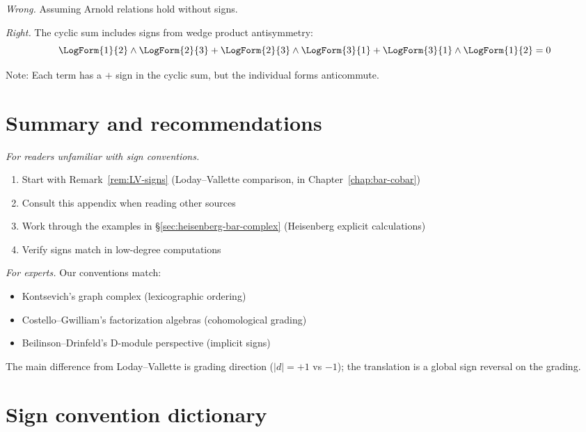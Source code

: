 \emph{Wrong.} Assuming Arnold relations hold without signs.

\emph{Right.} The cyclic sum includes signs from wedge product antisymmetry:
\[\LogForm{1}{2} \wedge \LogForm{2}{3} + \LogForm{2}{3} \wedge \LogForm{3}{1} + \LogForm{3}{1} \wedge \LogForm{1}{2} = 0\]

Note: Each term has a $+$ sign in the cyclic sum, but the individual forms anticommute.

\section{Summary and recommendations}

\emph{For readers unfamiliar with sign conventions.}
\begin{enumerate}
\item Start with Remark~\ref{rem:LV-signs} (Loday--Vallette comparison, in Chapter~\ref{chap:bar-cobar})
\item Consult this appendix when reading other sources
\item Work through the examples in \S\ref{sec:heisenberg-bar-complex} (Heisenberg explicit calculations)
\item Verify signs match in low-degree computations
\end{enumerate}

\emph{For experts.}
Our conventions match:
\begin{itemize}
\item Kontsevich's graph complex (lexicographic ordering)
\item Costello--Gwilliam's factorization algebras (cohomological grading)
\item Beilinson--Drinfeld's D-module perspective (implicit signs)
\end{itemize}

The main difference from Loday--Vallette is grading direction ($|d| = +1$ vs $-1$); the translation is a global sign reversal on the grading.

\section{Sign convention dictionary}
\label{sec:sign-dictionary-complete}

